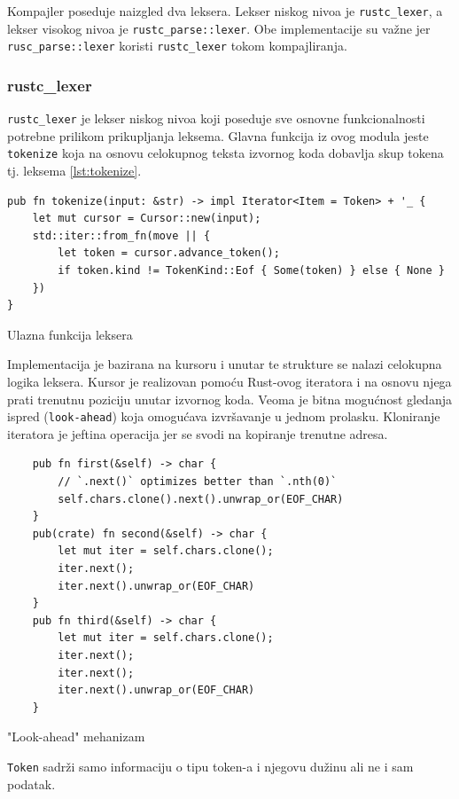 \documentclass[11pt]{article}
\begin{document}
Kompajler poseduje naizgled dva leksera. Lekser niskog nivoa je \verb|rustc_lexer|, a lekser visokog nivoa je \verb|rustc_parse::lexer|. 
Obe implementacije su važne jer \verb|rusc_parse::lexer| koristi \verb|rustc_lexer| tokom kompajliranja.

\subsubsection{rustc\_lexer}

\verb|rustc_lexer| je lekser niskog nivoa koji poseduje sve osnovne
funkcionalnosti potrebne prilikom prikupljanja leksema.
Glavna funkcija iz ovog modula jeste \verb|tokenize| koja na osnovu celokupnog teksta 
izvornog koda dobavlja skup tokena tj. leksema \ref{lst:tokenize}.

\begin{listing}[H]
\begin{verbatim}
pub fn tokenize(input: &str) -> impl Iterator<Item = Token> + '_ {
    let mut cursor = Cursor::new(input);
    std::iter::from_fn(move || {
        let token = cursor.advance_token();
        if token.kind != TokenKind::Eof { Some(token) } else { None }
    })
}
\end{verbatim}
\caption{Ulazna funkcija leksera}
\label{lst:tokenize}
\end{listing}

Implementacija je bazirana na kursoru i unutar te strukture se nalazi celokupna logika leksera. 
Kursor je realizovan pomoću Rust-ovog iteratora i na osnovu njega prati trenutnu poziciju 
unutar izvornog koda. Veoma je bitna mogućnost gledanja ispred (\verb|look-ahead|) koja omogućava 
izvršavanje u jednom prolasku.
Kloniranje iteratora je jeftina operacija jer se svodi na kopiranje trenutne adresa.

\begin{listing}[H]
\begin{verbatim}
    pub fn first(&self) -> char {
        // `.next()` optimizes better than `.nth(0)`
        self.chars.clone().next().unwrap_or(EOF_CHAR)
    }
    pub(crate) fn second(&self) -> char {
        let mut iter = self.chars.clone();
        iter.next();
        iter.next().unwrap_or(EOF_CHAR)
    }
    pub fn third(&self) -> char {
        let mut iter = self.chars.clone();
        iter.next();
        iter.next();
        iter.next().unwrap_or(EOF_CHAR)
    }
\end{verbatim}
\caption{"Look-ahead" mehanizam}
\end{listing}
\verb|Token| sadrži samo informaciju o tipu token-a i njegovu dužinu ali ne i 
sam podatak.
\end{document}
